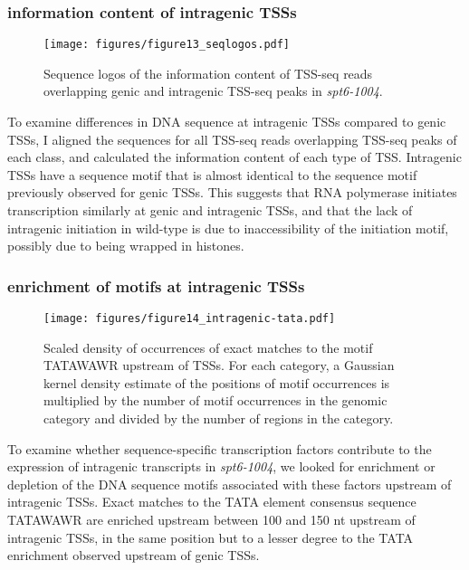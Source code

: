 \documentclass[10pt, letterpaper]{article}
\begin{document}
\pagebreak

\subsubsection{information content of intragenic TSSs}

\begin{wrapfigure}[12]{R}{8.72cm}
\centering
\texttt{[image: figures/figure13\_seqlogos.pdf]}
\caption{Sequence logos of the information content of TSS-seq reads overlapping genic and intragenic TSS-seq peaks in \textit{spt6-1004}.}
\end{wrapfigure}

To examine differences in DNA sequence at intragenic TSSs compared to genic TSSs, I aligned the sequences for all TSS-seq reads overlapping TSS-seq peaks of each class, and calculated the information content of each type of TSS. Intragenic TSSs have a sequence motif that is almost identical to the sequence motif previously observed for genic TSSs. This suggests that RNA polymerase initiates transcription similarly at genic and intragenic TSSs, and that the lack of intragenic initiation in wild-type is due to inaccessibility of the initiation motif, possibly due to being wrapped in histones.

\subsubsection{enrichment of motifs at intragenic TSSs}

\begin{wrapfigure}[12]{r}{8.72cm}
\centering
\texttt{[image: figures/figure14\_intragenic-tata.pdf]}
\caption{Scaled density of occurrences of exact matches to the motif TATAWAWR upstream of TSSs. For each category, a Gaussian kernel density estimate of the positions of motif occurrences is multiplied by the number of motif occurrences in the genomic category and divided by the number of regions in the category.}
\end{wrapfigure}

To examine whether sequence-specific transcription factors contribute to the expression of intragenic transcripts in \textit{spt6-1004}, we looked for enrichment or depletion of the DNA sequence motifs associated with these factors upstream of intragenic TSSs. Exact matches to the TATA element consensus sequence TATAWAWR are enriched upstream between 100 and 150 nt upstream of intragenic TSSs, in the same position but to a lesser degree to the TATA enrichment observed upstream of genic TSSs.
\end{document}
